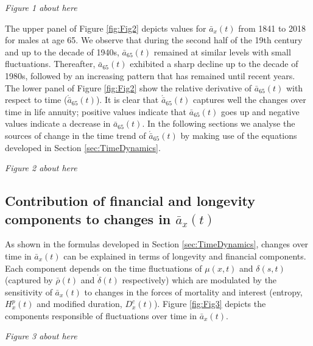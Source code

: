 \documentclass[12pt]{article}
\begin{document}
\begin{center}
	\textit{Figure 1 about here}
\end{center}




The upper panel of Figure \ref{fig:Fig2} depicts values for $\bar{a}_x(t)$ from 1841 to 2018 for males at age 65. We observe that during the second half of the 19th century and up to the decade of 1940s, $\bar{a}_{65}(t)$ remained at similar levels with small fluctuations. Thereafter, $\bar{a}_{65}(t)$ exhibited a sharp decline up to the decade of 1980s, followed by an increasing pattern that has remained until recent years. The lower panel of Figure \ref{fig:Fig2} show the relative derivative of $\bar{a}_{65}(t)$ with respect to time ($\acute{\bar{a}}_{65}(t)$). It is clear that $\acute{\bar{a}}_{65}(t)$ captures well the changes over time in life annuity; positive values indicate that $\bar{a}_{65}(t)$ goes up and negative values indicate a decrease in $\bar{a}_{65}(t)$. In the following sections we analyse the sources of change in the time trend of $\acute{\bar{a}}_{65}(t)$ by making use of the equations developed in Section \ref{sec:TimeDynamics}.


\begin{center}
	\textit{Figure 2 about here}
\end{center}


\subsection{Contribution of financial and longevity components to changes in $\bar{a}_x(t)$}

As shown in the formulas developed in Section \ref{sec:TimeDynamics}, changes over time in $\bar{a}_x(t)$ can be explained in terms of longevity and financial components. Each component depends on the time fluctuations of $\mu(x,t)$ and $\delta(s,t)$ (captured by $\bar{\rho}(t)$ and $\dot{\delta}(t)$ respectively) which are modulated by the sensitivity of $\bar{a}_x(t)$ to changes in the forces of mortality and interest (entropy, ${H}^{p}_x(t)$ and modified duration, ${D}^{c}_x(t)$). Figure \ref{fig:Fig3} depicts the components responsible of fluctuations over time in $\bar{a}_x(t)$.

\begin{center}
	\textit{Figure 3 about here}
\end{center}
\end{document}
